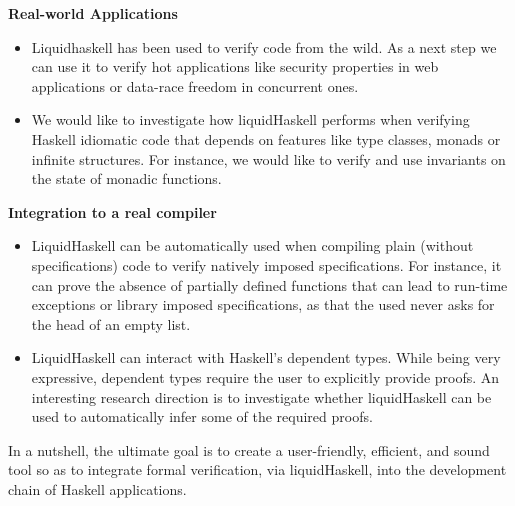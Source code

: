 \textbf{Real-world Applications}
\begin{itemize}

\item Liquidhaskell has been used to verify code from the wild.
As a next step we can use it to verify hot applications
like security properties in web applications
or data-race freedom in concurrent ones.

\item 
  We would like to investigate how liquidHaskell performs when verifying Haskell idiomatic 
  code that depends on features like type classes, monads or infinite structures.
  For instance, we would like to verify and use invariants on the state 
  of monadic functions.
\end{itemize}

\textbf{Integration to a real compiler}
\begin{itemize}
\item LiquidHaskell can be automatically used when compiling 
      plain (without specifications) code
      to verify natively imposed specifications. 
For instance, it can prove the absence of partially defined functions 
 that can lead to run-time exceptions or 
 library imposed specifications, as that 
 the used never asks for the head of an empty list.
 
\item LiquidHaskell can interact with Haskell's dependent types. 
  While being very expressive, dependent types require the user to 
  explicitly provide proofs.
  An interesting research direction is to investigate 
  whether liquidHaskell can be used to automatically infer
  some of the required proofs.
  \end{itemize}

In a nutshell, the ultimate goal is to create a 
user-friendly, efficient, and sound tool 
so as to integrate formal verification, via liquidHaskell, 
into the development chain of Haskell applications.

